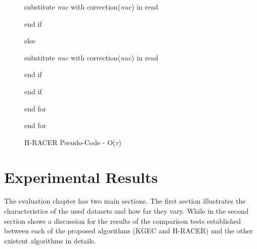 \documentclass[12pt,openany]{llncs}
\begin{document}
\begin{figure}
\begin{bordered}
\noindent\hspace{18ex}substitute \textit{nuc} with correction(\textit{nuc}) in read

\noindent\hspace{15ex}end if		

\noindent\hspace{12ex}else 

\noindent\hspace{15ex}substitute \textit{nuc} with correction(\textit{nuc}) in read

\noindent\hspace{12ex}end if

\noindent\hspace{9ex}end if

\noindent\hspace{6ex}end for 

\noindent\hspace{3ex}end for 
\end{bordered}
\caption{\label{fig:fig-HRACER-PSC}H-RACER Pseudo-Code - O(\textit{r})}
\end{figure}
\newpage

\chapter{\label{chap:6}Experimental Results}
The evaluation chapter has two main sections. The first section illustrates the characteristics of the used datasets and how far they vary. While in the second section shows a discussion for the results of the comparison tests established between each of the proposed algorithms (KGEC and H-RACER) and the other existent algorithms in details.
\end{document}
